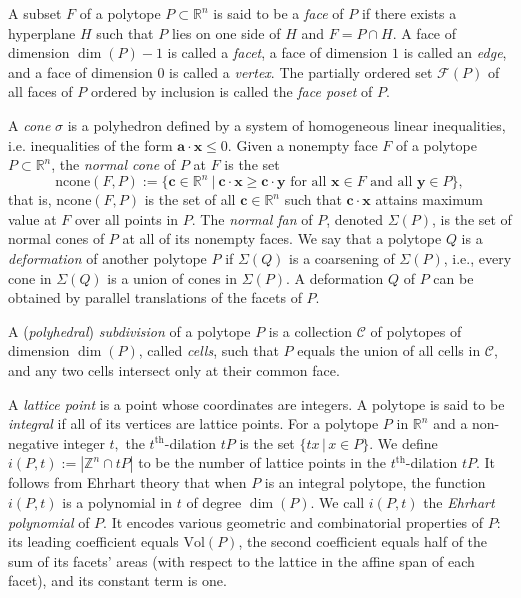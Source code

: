\documentclass[12pt,reqno]{article}%
\theoremstyle{definition}
\numberwithin{equation}{section}
\newcommand{\vol}{\mathrm{Vol}}
\newcommand{\bba}{\mathbf{a}}
\newcommand{\bbc}{\mathbf{c}}
\newcommand{\bbx}{\mathbf{x}}
\newcommand{\bby}{\mathbf{y}}
\newcommand{\ncone}{\mathrm{ncone}}
\newcommand{\Z}{\mathbb Z}
\newcommand{\R}{\mathbb R}
\newcommand{\calC}{\mathcal{C}}
\newcommand{\calF}{\mathcal{F}}
\begin{document}
 A subset $F$ of a polytope $P \subset \R^n$ is said to be a \emph{face} of $P$ if there exists a hyperplane $H$ such that $P$ lies on one side of $H$ and $F = P\cap H.$ A face of dimension $\dim(P) - 1$ is called a \emph{facet}, a face of dimension $1$ is called an \emph{edge}, and a face of dimension 0 is called a \emph{vertex}. The partially ordered set $\calF(P)$ of all faces of $P$ ordered by inclusion is called the \emph{face poset} of $P$.
 
 A \emph{cone} $\sigma$ is a polyhedron defined by a system of homogeneous linear inequalities, i.e. inequalities of the form $\bba\cdot \bbx \leq 0$. Given a nonempty face $F$ of a polytope $P \subset \R^n$, the \emph{normal cone} of $P$ at $F$ is the set
\[\ncone(F,P) := \{\bbc \in \R^n \ | \ \bbc\cdot \bbx \geq \bbc \cdot \bby \text{ for all } \bbx \in F \text{ and all } \bby \in P\},\]
that is, $\ncone(F,P)$ is the set of all $\bbc \in \R^n$ such that $\bbc \cdot \bbx$ attains maximum value at $F$ over all points in $P$. The \emph{normal fan} of $P$, denoted $\Sigma(P)$, is the set of normal cones of $P$ at all of its nonempty faces. We say that a polytope $Q$ is a \emph{deformation} of another polytope $P$ if $\Sigma(Q)$ is a coarsening of $\Sigma(P)$, i.e., every cone in $\Sigma(Q)$ is a union of cones in $\Sigma(P)$. A deformation $Q$ of $P$ can be obtained by parallel translations of the facets of $P$.

A (\emph{polyhedral}) \emph{subdivision} of a polytope $P$ is a collection $\calC$ of polytopes of dimension $\dim(P)$, called \emph{cells}, such that $P$ equals the union of all cells in $\calC$, and any two cells intersect only at their common face.

A \emph{lattice point} is a point whose coordinates are integers. A polytope is said to be  \textit{integral} if all of its vertices are lattice points. For a polytope $P$ in $\R^n$ and a non-negative integer $t,$ the $t^{\mathrm{th}}$-dilation $tP$ is the set $\{tx \,|\, x \in P\}.$ We define
$i(P,t) := |\Z^n \cap tP|$ to be the number of lattice points in the $t^\mathrm{th}$-dilation $tP.$ It follows from Ehrhart theory \cite{Ehrhart1962} that when $P$ is an integral polytope, the function $i(P,t)$ is a polynomial in $t$ of degree $\dim(P)$. We call $i(P,t)$ the \emph{Ehrhart polynomial} of $P$. It encodes various geometric and combinatorial properties of $P$: its leading coefficient equals $\vol(P)$, the second coefficient equals half of the sum of its facets' areas (with respect to the lattice in the affine span of each facet), and its constant term is one.
\end{document}
